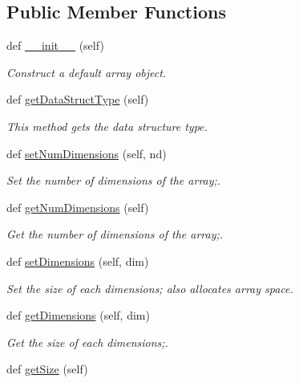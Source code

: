 \subsection*{Public Member Functions}
\begin{DoxyCompactItemize}
\item 
def \hyperlink{class_array_1_1_array_a3f63c2cb80dd28142f7c04dbe47a03fa}{\+\_\+\+\_\+init\+\_\+\+\_\+} (self)
\begin{DoxyCompactList}\small\item\em Construct a default array object. \end{DoxyCompactList}\item 
def \hyperlink{class_array_1_1_array_a4cfe6b173521a8df7448e0b87209fe52}{get\+Data\+Struct\+Type} (self)
\begin{DoxyCompactList}\small\item\em This method gets the data structure type. \end{DoxyCompactList}\item 
def \hyperlink{class_array_1_1_array_a5ec020721506da4d66ee5ad921d11311}{set\+Num\+Dimensions} (self, nd)
\begin{DoxyCompactList}\small\item\em Set the number of dimensions of the array;. \end{DoxyCompactList}\item 
def \hyperlink{class_array_1_1_array_a713b383572b6cd307aafa8ebea7a8889}{get\+Num\+Dimensions} (self)
\begin{DoxyCompactList}\small\item\em Get the number of dimensions of the array;. \end{DoxyCompactList}\item 
def \hyperlink{class_array_1_1_array_adbf2f093eda8445c63c9532ac37f310c}{set\+Dimensions} (self, dim)
\begin{DoxyCompactList}\small\item\em Set the size of each dimensions; also allocates array space. \end{DoxyCompactList}\item 
def \hyperlink{class_array_1_1_array_aafd492514af99656f08d4bec38b25ffc}{get\+Dimensions} (self, dim)
\begin{DoxyCompactList}\small\item\em Get the size of each dimensions;. \end{DoxyCompactList}\item 
def \hyperlink{class_array_1_1_array_acc74b9873bd0ecbe67929cbd073ac3e1}{get\+Size} (self)

\end{DoxyCompactItemize}
